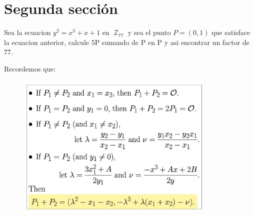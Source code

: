 \documentclass[12pt, fleqn]{report}                             %
\theoremstyle{break}                                            %
\DeclareMathOperator \Integers     {\mathbb{Z}}                 %
\begin{document}
\chapter{Segunda sección}

  Sea la ecuacion $y^2 = x^3 + x + 1$ en $\Integers_{77}$ y sea el 
  punto $P = (0, 1)$ que satisface la ecuacion anterior, 
  calcule 5P sumando de P en P y asi encontrar un factor de 77.

  Recordemos que:
  \begin{figure}[h]
    \centering
    \includegraphics[width=0.85\textwidth]{Tip}
  \end{figure}

  \clearpage
\end{document}
